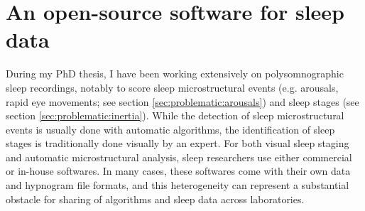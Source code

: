 \section{An open-source software for sleep data}
\label{sec:problematic:software}

During my PhD thesis, I have been working extensively on polysomnographic sleep recordings, notably to score sleep microstructural events (e.g. arousals, rapid eye movements; see section \ref{sec:problematic:arousals}) and sleep stages (see section \ref{sec:problematic:inertia}). While the detection of sleep microstructural events is usually done with automatic algorithms, the identification of sleep stages is traditionally done visually by an expert. For both visual sleep staging and automatic microstructural analysis, sleep researchers use either commercial or in-house softwares. In many cases, these softwares come with their own data and hypnogram file formats, and this heterogeneity can represent a substantial obstacle for sharing of algorithms and sleep data across laboratories.



